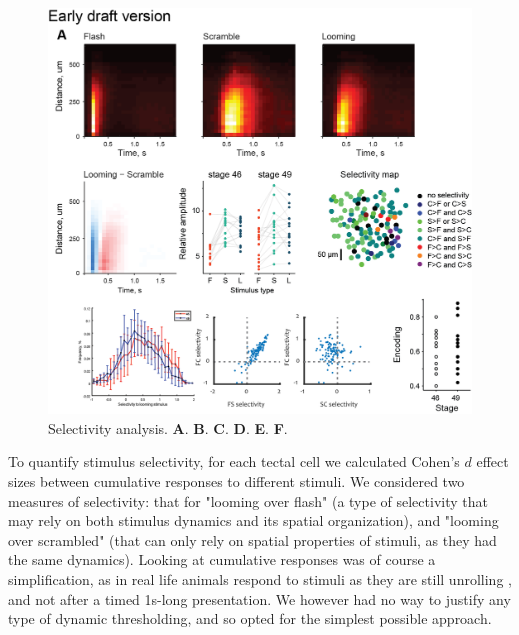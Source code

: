 \documentclass{article}
\begin{document}
\begin{figure}
\includegraphics[width=\linewidth]{fig2.png}
\caption{
Selectivity analysis. \textbf{A}. \textbf{B}. \textbf{C}. \textbf{D}. \textbf{E}. \textbf{F}. }
\end{figure}

To quantify stimulus selectivity, for each tectal cell we calculated Cohen’s $d$ effect sizes between cumulative responses to different stimuli. We considered two measures of selectivity: that for "looming over flash" (a type of selectivity that may rely on both stimulus dynamics and its spatial organization), and "looming over scrambled" (that can only rely on spatial properties of stimuli, as they had the same dynamics). Looking at cumulative responses was of course a simplification, as in real life animals respond to stimuli as they are still unrolling \citep{peron2009adaptation,khakhalin2014}, and not after a timed 1s-long presentation. We however had no way to justify any type of dynamic thresholding, and so opted for the simplest possible approach.
\end{document}
